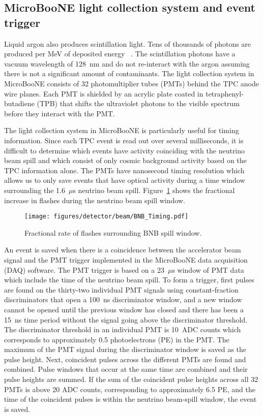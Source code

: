 \subsection{MicroBooNE light collection system and event trigger}\label{sec:swtrigger}
  Liquid argon also produces scintillation light. Tens of thousands of photons
  are produced per MeV of deposited energy ~\cite{Acciarri:2016smi}. The
  scintillation photons have a vacuum wavelength of 128~nm and do not
  re-interact with the argon assuming there is not a significant amount of
  contaminants. The light collection system in MicroBooNE consists of 32
  photomultiplier tubes (PMTs) behind the TPC anode wire planes.  Each PMT is
  shielded by an acrylic plate coated in tetraphenyl-butadiene (TPB) that
  shifts the ultraviolet photons to the visible spectrum before they interact
  with the PMT.

  The light collection system in MicroBooNE is particularly useful for timing
  information. Since each TPC event is read out over several milliseconds, it
  is difficult to determine which events have activity coinciding with the
  neutrino beam spill and which consist of only cosmic background activity
  based on the TPC information alone. The PMTs have nanosecond timing
  resolution which allows us to only save events that have optical activity
  during a time window surrounding the 1.6~$\mu$s neutrino beam spill.
  Figure~\ref{fig:bnbtiming} shows the fractional increase in flashes during
  the neutrino beam spill window.

  \begin{figure}[h]
    \centering
    \texttt{[image: figures/detector/beam/BNB\_Timing.pdf]}
    \caption{Fractional rate of flashes surrounding BNB spill window.}
    \label{fig:bnbtiming}
  \end{figure}

  An event is saved when there is a coincidence between the accelerator beam
  signal and the PMT trigger implemented in the MicroBooNE data acquisition
  (DAQ) software. The PMT trigger is based on a 23~$\mu$s window of PMT data
  which include the time of the neutrino beam spill. To form a trigger, first
  pulses are found on the thirty-two individual PMT signals using
  constant-fraction discriminators that open a 100~ns discriminator window, and
  a new window cannot be opened until the previous window has closed and there
  has been a 15~ns time period without the signal going above the discriminator
  threshold.  The discriminator threshold in an individual PMT is 10~ADC counts
  which corresponds to approximately 0.5 photoelectrons (PE) in the PMT. The
  maximum of the PMT signal during the discriminator window is saved as the
  pulse height.  Next, coincident pulses across the different PMTs are found
  and combined.  Pulse windows that occur at the same time are combined and
  their pulse heights are summed. If the sum of the coincident pulse heights
  across all 32 PMTs is above 20 ADC counts, corresponding to approximately 6.5
  PE, and the time of the coincident pulses is within the neutrino beam-spill
  window, the event is saved.


